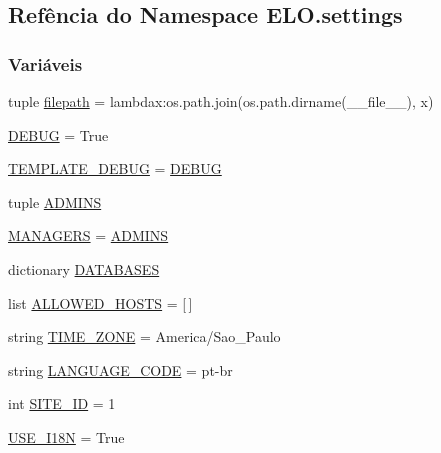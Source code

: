 \hypertarget{namespaceELO_1_1settings}{}\subsection{Refência do Namespace E\+L\+O.\+settings}
\label{namespaceELO_1_1settings}
\subsubsection*{Variáveis}
\begin{DoxyCompactItemize}
\item 
tuple \hyperlink{namespaceELO_1_1settings_a7730264ddd478343e0f282f36d4a5ab4}{filepath} = lambdax\+:os.\+path.\+join(os.\+path.\+dirname(\+\_\+\+\_\+file\+\_\+\+\_\+), x)
\item 
\hyperlink{namespaceELO_1_1settings_a62f457ac29cc6f3e85282c71ce3b4f26}{D\+E\+B\+U\+G} = True
\item 
\hyperlink{namespaceELO_1_1settings_a014930e0bf77feccc65c20212593381e}{T\+E\+M\+P\+L\+A\+T\+E\+\_\+\+D\+E\+B\+U\+G} = \hyperlink{namespaceELO_1_1settings_a62f457ac29cc6f3e85282c71ce3b4f26}{D\+E\+B\+U\+G}
\item 
tuple \hyperlink{namespaceELO_1_1settings_a051220bd8105ba13b2720df11c1950ba}{A\+D\+M\+I\+N\+S}
\item 
\hyperlink{namespaceELO_1_1settings_a43e8826e0b24e337065b4975f3eace4c}{M\+A\+N\+A\+G\+E\+R\+S} = \hyperlink{namespaceELO_1_1settings_a051220bd8105ba13b2720df11c1950ba}{A\+D\+M\+I\+N\+S}
\item 
dictionary \hyperlink{namespaceELO_1_1settings_a91ed1425b7f1cf041960832ce5b54b6e}{D\+A\+T\+A\+B\+A\+S\+E\+S}
\item 
list \hyperlink{namespaceELO_1_1settings_afd72644768367440ae1a89e9fe95cde5}{A\+L\+L\+O\+W\+E\+D\+\_\+\+H\+O\+S\+T\+S} = \mbox{[}$\,$\mbox{]}
\item 
string \hyperlink{namespaceELO_1_1settings_aafd318ffa70db1890eaf1f8621e19d53}{T\+I\+M\+E\+\_\+\+Z\+O\+N\+E} = \textquotesingle{}America/Sao\+\_\+\+Paulo\textquotesingle{}
\item 
string \hyperlink{namespaceELO_1_1settings_a388841a63bae5418e55fb741f938d4fb}{L\+A\+N\+G\+U\+A\+G\+E\+\_\+\+C\+O\+D\+E} = \textquotesingle{}pt-\/br\textquotesingle{}
\item 
int \hyperlink{namespaceELO_1_1settings_a31328123344da3768e97b0ac61c342de}{S\+I\+T\+E\+\_\+\+I\+D} = 1
\item 
\hyperlink{namespaceELO_1_1settings_a2d03ced1be44b9d7937bdbc870474ffe}{U\+S\+E\+\_\+\+I18\+N} = True

\end{DoxyCompactItemize}
